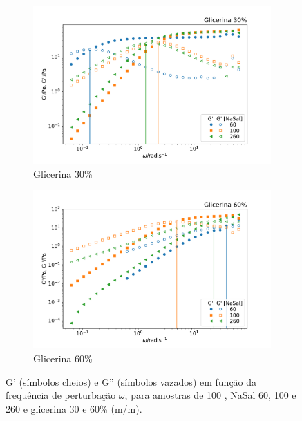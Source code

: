 	\begin{figure}[h]
		\begin{subfigure}[t]{0.5\textwidth}
			\centering
			\includegraphics[width=\textwidth]{imagens/reologia/oscilatorio_glic30p}
			\caption{Glicerina 30\%}
			\label{fig:oscilatorio_glic_30p}
		\end{subfigure} %
		\begin{subfigure}[t]{0.5\textwidth}
			\centering
			\includegraphics[width=\textwidth]{imagens/reologia/oscilatorio_glic60p}
			\caption{Glicerina 60\%}
			\label{fig:oscilatorio_glic_60p}
		\end{subfigure} %
	\caption{G' (símbolos cheios) e G'' (símbolos vazados) em função da frequência de perturbação \(\omega\), para amostras de \CTAB{} 100 \mM{}, NaSal 60, 100 e 260 \mM{} e glicerina 30 e 60\% (m/m).}
	\label{fig:oscilatorio_glicerina}
	\end{figure} 	

